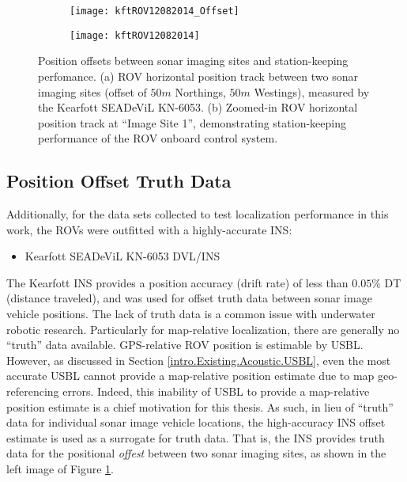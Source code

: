 \begin{figure} [!h]
	\centering
	\begin{subfigure}[b]{0.495\textwidth}
                \texttt{[image: kftROV12082014\_Offset]}
                \caption{}
	\end{subfigure}
  	\centering
	\begin{subfigure}[b]{0.495\textwidth}
                \texttt{[image: kftROV12082014]}
		\caption{}
  	\end{subfigure}
	\caption{Position offsets between sonar imaging sites and station-keeping perfomance. (a) ROV horizontal position track between two sonar imaging sites (offset of $50m$ Northings, $50m$ Westings), measured by the Kearfott SEADeViL KN-6053. (b) Zoomed-in ROV horizontal position track at ``Image Site 1'', demonstrating station-keeping performance of the ROV onboard control system. }
	\label{fig:kft}
\end{figure}

\subsection{Position Offset Truth Data}
\label{rov.Experimental.Position}

Additionally, for the data sets collected to test localization performance in this work, the ROVs were outfitted with a highly-accurate INS: 

\begin{itemize}
\item Kearfott SEADeViL KN-6053 DVL/INS
\end{itemize}

The Kearfott INS provides a position accuracy (drift rate) of less than $0.05 \%$ DT (distance traveled), and was used for offset truth data between sonar image vehicle positions.
The lack of truth data is a common issue with underwater robotic research.
Particularly for map-relative localization, there are generally no ``truth'' data available.
GPS-relative ROV position is estimable by USBL.
However, as discussed in Section \ref{intro.Existing.Acoustic.USBL}, even the most accurate USBL cannot provide a map-relative position estimate due to map geo-referencing errors.
Indeed, this inability of USBL to provide a map-relative position estimate is a chief motivation for this thesis.
As such, in lieu of ``truth'' data for individual sonar image vehicle locations, the high-accuracy INS offset estimate is used as a surrogate for truth data.
That is, the INS provides truth data for the positional \emph{offest} between two sonar imaging sites, as shown in the left image of Figure \ref{fig:kft}.

